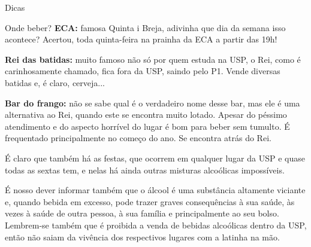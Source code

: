 \begin{secao}{Dicas}
\begin{subsecao}{Onde beber?}
{\bf ECA:} famosa Quinta i Breja, adivinha que dia da semana isso acontece?
Acertou, toda quinta-feira na prainha da ECA a partir das 19h!

{\bf Rei das batidas:} muito famoso não só por quem estuda na USP, o Rei,
como é carinhosamente chamado, fica fora da USP, saindo pelo P1. Vende
diversas batidas e, é claro, cerveja...

{\bf Bar do frango:} não se sabe qual é o verdadeiro nome desse bar, mas ele é
uma alternativa ao Rei, quando este se encontra muito lotado. Apesar do péssimo atendimento
e do aspecto horrível do lugar é bom para beber sem
tumulto. É frequentado principalmente no começo do ano. Se encontra atrás do Rei.

É claro que também há as festas, que ocorrem em qualquer lugar da USP e quase todas as sextas tem, e nelas
há ainda outras misturas alcoólicas impossíveis.

É nosso dever informar também que o álcool é uma substância altamente viciante
e, quando bebida em excesso, pode trazer graves consequências à sua saúde, às
vezes à saúde de outra pessoa, à sua família e principalmente ao seu bolso. Lembrem-se
também que é proibida a venda de bebidas alcoólicas dentro da USP, então
não saiam da vivência dos respectivos lugares com a latinha na mão.

\end{subsecao}
\end{secao}
